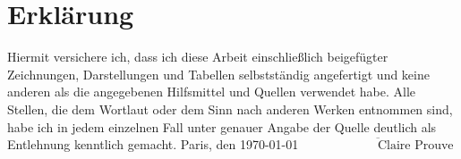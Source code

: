 \documentclass{wissdoc}
\newcommand{\blankpage}{%
\clearpage{\pagestyle{empty}\cleardoublepage}
}
\begin{document}



\chapter*{Erkl\"arung}
Hiermit versichere ich, dass ich diese Arbeit einschlie\ss lich beigef\"ugter Zeichnun\-gen, Darstellungen und Tabellen selbst\-st\"andig an\-gefertigt und keine anderen als die ange\-gebenen Hilfsmittel und Quellen verwendet habe. Alle Stellen, die dem Wortlaut oder dem Sinn nach anderen Werken entnommen sind, habe ich in jedem einzelnen Fall unter genauer Angabe der Quelle deutlich als Entlehnung kenntlich gemacht.
 \vspace{1.5cm}
  \flushright Paris, den \today
  \vskip 3cm
  \flushright 
$\overline{\qquad \qquad \qquad \mbox{Claire Prouve}}$
\blankpage
\end{document}
